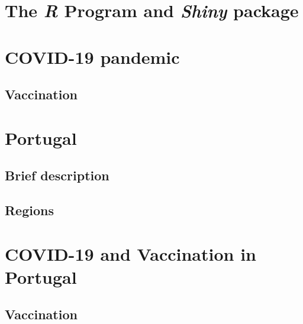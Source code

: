 \documentclass[11pt,a4paper]{report}
\def\R{{\textsl{R }}}
\def\Shiny{\textsl{Shiny }}
\begin{document}
\section{The \R Program and \Shiny package}




\section{COVID-19 pandemic}



\subsection{Vaccination}



\section{Portugal}

\subsection{Brief description}


\subsection{Regions}






\section{COVID-19 and Vaccination in Portugal}



\subsection{Vaccination}

\end{document}
